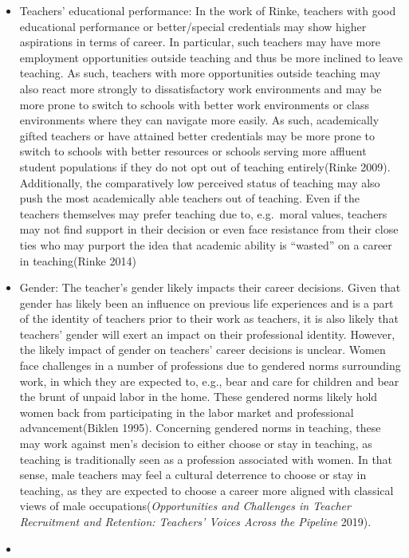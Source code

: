 \documentclass[
]{article}
\begin{document}
\begin{itemize}
  \begin{itemize}
  \item
    Teachers' educational performance: In the work of Rinke, teachers with good educational performance or better/special credentials may show higher aspirations in terms of career. In particular, such teachers may have more employment opportunities outside teaching and thus be more inclined to leave teaching. As such, teachers with more opportunities outside teaching may also react more strongly to dissatisfactory work environments and may be more prone to switch to schools with better work environments or class environments where they can navigate more easily. As such, academically gifted teachers or have attained better credentials may be more prone to switch to schools with better resources or schools serving more affluent student populations if they do not opt out of teaching entirely(Rinke 2009). Additionally, the comparatively low perceived status of teaching may also push the most academically able teachers out of teaching. Even if the teachers themselves may prefer teaching due to, e.g.~moral values, teachers may not find support in their decision or even face resistance from their close ties who may purport the idea that academic ability is ``wasted'' on a career in teaching(Rinke 2014)
  \item
    Gender: The teacher's gender likely impacts their career decisions. Given that gender has likely been an influence on previous life experiences and is a part of the identity of teachers prior to their work as teachers, it is also likely that teachers' gender will exert an impact on their professional identity. However, the likely impact of gender on teachers' career decisions is unclear. Women face challenges in a number of professions due to gendered norms surrounding work, in which they are expected to, e.g., bear and care for children and bear the brunt of unpaid labor in the home. These gendered norms likely hold women back from participating in the labor market and professional advancement(Biklen 1995). Concerning gendered norms in teaching, these may work against men's decision to either choose or stay in teaching, as teaching is traditionally seen as a profession associated with women. In that sense, male teachers may feel a cultural deterrence to choose or stay in teaching, as they are expected to choose a career more aligned with classical views of male occupations(\emph{Opportunities and Challenges in Teacher Recruitment and Retention: Teachers' Voices Across the Pipeline} 2019).
  \item

\end{itemize}
\end{itemize}
\end{document}

